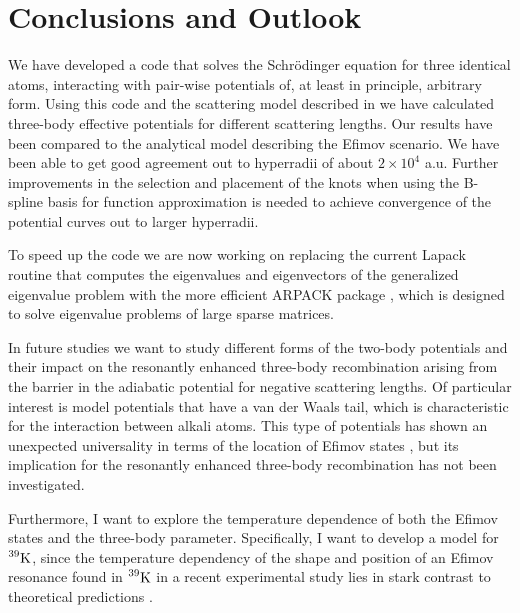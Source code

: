 \chapter{Conclusions and Outlook}\label{chap:8}
We have developed a code that solves the Schrödinger equation for three identical atoms, interacting with pair-wise potentials of, at least in principle, arbitrary form. Using this code and the scattering model described in  we have calculated three-body effective potentials for different scattering lengths. Our results have been compared to the analytical model describing the Efimov scenario. We have been able to get good agreement out to hyperradii of about $2 \times 10^4$ a.u. Further improvements in the selection and placement of the knots when using the B-spline basis for function approximation is needed to achieve convergence of the potential curves out to larger hyperradii. 

To speed up the code we are now working on replacing the current Lapack routine that computes the eigenvalues and eigenvectors of the generalized eigenvalue problem with the more efficient ARPACK package \cite{arpack}, which is designed to solve eigenvalue problems of large sparse matrices. 

In future studies we want to study different forms of the two-body potentials and their impact on the resonantly enhanced three-body recombination arising from the barrier in the adiabatic potential for negative scattering lengths. Of particular interest is model potentials that have a van der Waals tail, which is characteristic for the interaction between alkali atoms. This type of potentials has shown an unexpected universality in terms of the location of Efimov states \cite{3BP_origin}, but its implication for the resonantly enhanced three-body recombination has not been investigated. 

Furthermore, I want to explore the temperature dependence of both the Efimov states and the three-body parameter. Specifically, I want to develop a model for $\prescript{39}{}{\mathrm{K}}$, since the temperature dependency of the shape and position of an Efimov resonance found in $\prescript{39}{}{\mathrm{K}}$ in a recent experimental study lies in stark contrast to theoretical predictions \cite{Wacker_2018}. 